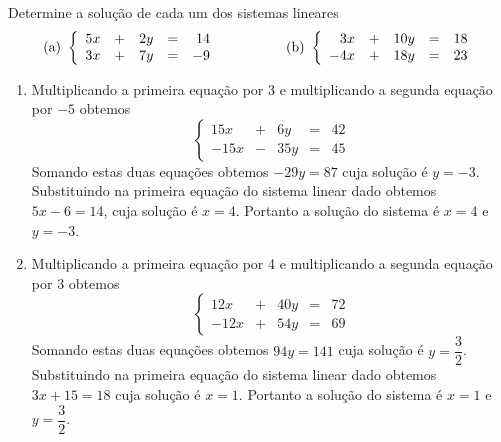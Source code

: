 \begin{problem}
Determine a solução de cada um dos sistemas lineares
$$\text{(a)}\ \left\{ \begin{array}{rrrrr}
 5x & + &  2y &   = & 14 \\
 3x & + &  7y &   = & -9 \end{array} \right. \ \ \ \ \ \ \ \ \ \ \ \ \ \ \ \\
	\text{(b)}\ \left\{ \begin{array}{rrrrr}
 3x & + &  10y &   = & 18 \\
-4x & + &  18y &   = & 23 \end{array} \right.$$ 
\end{problem}
\begin{solution}
\begin{enumerate}
\item[(a)] Multiplicando a primeira equação por 3 e multiplicando a segunda equação por $-5$ obtemos
$$\left\{ \begin{array}{rrrrr}
 15x & + &  6y &   = &  42 \\
-15x & - & 35y &   = &  45 \end{array} \right.$$
Somando estas duas equações obtemos $-29y = 87$ cuja solução é $y=-3$.
Substituindo na primeira equação do sistema linear dado obtemos $5x - 6 = 14$, cuja solução é $x=4$.
Portanto a solução do sistema é $x=4$ e $y=-3$.

\item[(b)] Multiplicando a primeira equação por 4 e multiplicando a segunda equação por $3$ obtemos
$$\left\{ \begin{array}{rrrrr}
 12x & + &  40y &   = & 72 \\
-12x & + &  54y &   = & 69 \end{array} \right.$$
Somando estas duas equações obtemos $94y=141$ cuja solução é $y=\dfrac{3}{2}$.
Substituindo na primeira equação do sistema linear dado obtemos $3x + 15 = 18$ cuja solução é $x=1$.
Portanto a solução do sistema é $x=1$ e $y=\dfrac{3}{2}$.


\end{enumerate}
\end{solution}


